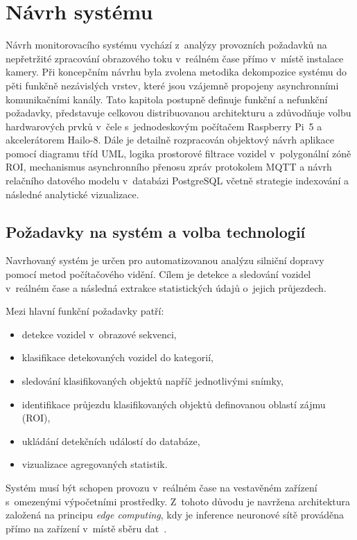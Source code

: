\chapter{Návrh systému}
Návrh monitorovacího systému vychází z~analýzy provozních požadavků na nepřetržité zpracování obrazového toku v~reálném čase přímo v~místě instalace kamery. Při koncepčním návrhu byla zvolena metodika dekompozice systému do pěti funkčně nezávislých vrstev, které jsou vzájemně propojeny asynchronními komunikačními kanály. Tato kapitola postupně definuje funkční a nefunkční požadavky, představuje celkovou distribuovanou architekturu a zdůvodňuje volbu hardwarových prvků v~čele s~jednodeskovým počítačem Raspberry Pi~5 a akcelerátorem Hailo-8. Dále je detailně rozpracován objektový návrh aplikace pomocí diagramu tříd \acs{UML}, logika prostorové filtrace vozidel v~polygonální zóně \acs{ROI}, mechanismus asynchronního přenosu zpráv protokolem \acs{MQTT} a návrh relačního datového modelu v~databázi PostgreSQL včetně strategie indexování a následné analytické vizualizace.

\section{Požadavky na systém a volba technologií}
Navrhovaný systém je určen pro automatizovanou analýzu silniční dopravy 
pomocí metod počítačového vidění. Cílem je detekce a sledování vozidel 
v~reálném čase a následná extrakce statistických údajů o~jejich průjezdech.

Mezi hlavní funkční požadavky patří:

\begin{itemize}
    \item detekce vozidel v~obrazové sekvenci,
    \item klasifikace detekovaných vozidel do kategorií,
    \item sledování klasifikovaných objektů napříč jednotlivými snímky,
    \item identifikace průjezdu klasifikovaných objektů definovanou oblastí zájmu (ROI),
    \item ukládání detekčních událostí do databáze,
    \item vizualizace agregovaných statistik.
\end{itemize}

Systém musí být schopen provozu v~reálném čase na vestavěném zařízení s~omezenými výpočetními prostředky. Z~tohoto důvodu je navržena architektura založená na principu \textit{edge computing}, kdy je inference neuronové sítě prováděna přímo na zařízení v~místě sběru dat~\cite{akira_edge_cloud}.

